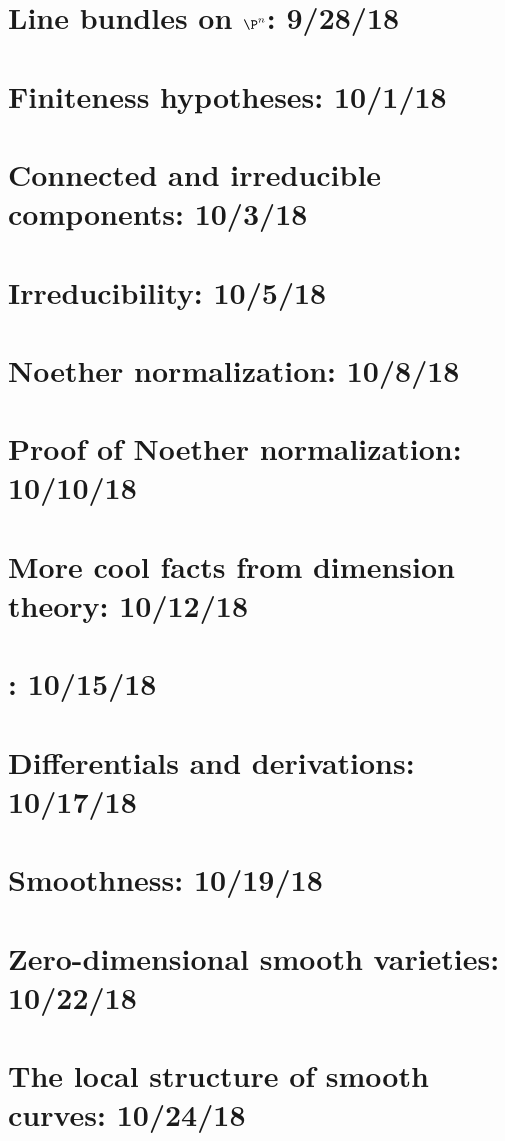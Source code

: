 \documentclass{notes_d}
\begin{document}
\section{Line bundles on $\P^n$: 9/28/18}
	
\section{Finiteness hypotheses: 10/1/18}
	
\section{Connected and irreducible components: 10/3/18}
	
\section{Irreducibility: 10/5/18}
	
\section{Noether normalization: 10/8/18}
	
\section{Proof of Noether normalization: 10/10/18}
	
\section{More cool facts from dimension theory: 10/12/18}
	
\section{: 10/15/18}
\section{Differentials and derivations: 10/17/18}
	
\section{Smoothness: 10/19/18}
	
\section{Zero-dimensional smooth varieties: 10/22/18}
	
\section{The local structure of smooth curves: 10/24/18}
	
\end{document}
